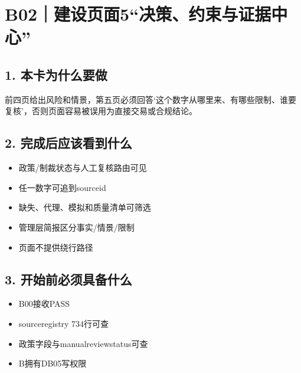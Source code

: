 \documentclass[UTF8,openany,zihao=-4]{ctexbook}
\renewcommand{\_}{\textunderscore\allowbreak}
\begin{document}
\clearpage
\section{B02｜建设页面5“决策、约束与证据中心”}
\subsection*{1. 本卡为什么要做}
前四页给出风险和情景，第五页必须回答‘这个数字从哪里来、有哪些限制、谁要复核’，否则页面容易被误用为直接交易或合规结论。


\subsection*{2. 完成后应该看到什么}
\begin{itemize}
\item 政策/制裁状态与人工复核路由可见
\item 任一数字可追到source\_id
\item 缺失、代理、模拟和质量清单可筛选
\item 管理层简报区分事实/情景/限制
\item 页面不提供绕行路径
\end{itemize}

\subsection*{3. 开始前必须具备什么}
\begin{itemize}[label=$\square$]
\item B00接收PASS
\item source\_registry 734行可查
\item 政策字段与manual\_review\_status可查
\item B拥有DB05写权限
\end{itemize}
\end{document}
